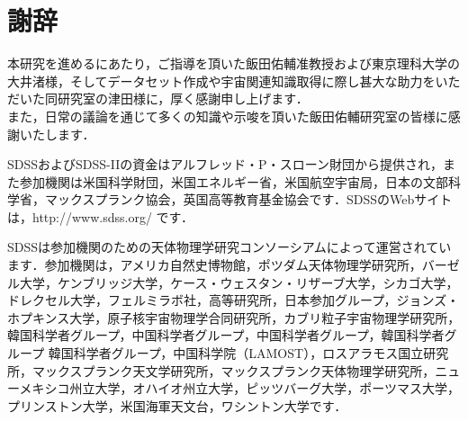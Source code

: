 \documentclass[a4j, 11pt]{jreport}
\begin{document}
\newpage
\chapter*{謝辞}
本研究を進めるにあたり，ご指導を頂いた飯田佑輔准教授および東京理科大学の大井渚様，そしてデータセット作成や宇宙関連知識取得に際し甚大な助力をいただいた同研究室の津田様に，厚く感謝申し上げます．\\
また，日常の議論を通じて多くの知識や示唆を頂いた飯田佑輔研究室の皆様に感謝いたします．

SDSSおよびSDSS-IIの資金はアルフレッド・P・スローン財団から提供され，また参加機関は米国科学財団，米国エネルギー省，米国航空宇宙局，日本の文部科学省，マックスプランク協会，英国高等教育基金協会です．SDSSのWebサイトは，http://www.sdss.org/ です． 

SDSSは参加機関のための天体物理学研究コンソーシアムによって運営されています．参加機関は，アメリカ自然史博物館，ポツダム天体物理学研究所，バーゼル大学，ケンブリッジ大学，ケース・ウェスタン・リザーブ大学，シカゴ大学，ドレクセル大学，フェルミラボ社，高等研究所，日本参加グループ，ジョンズ・ホプキンス大学，原子核宇宙物理学合同研究所，カブリ粒子宇宙物理学研究所，韓国科学者グループ，中国科学者グループ，中国科学者グループ，韓国科学者グループ 韓国科学者グループ，中国科学院（LAMOST），ロスアラモス国立研究所，マックスプランク天文学研究所，マックスプランク天体物理学研究所，ニューメキシコ州立大学，オハイオ州立大学，ピッツバーグ大学，ポーツマス大学，プリンストン大学，米国海軍天文台，ワシントン大学です．
\end{document}
